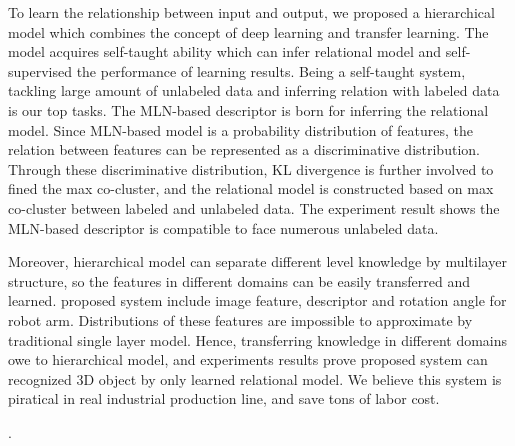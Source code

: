 \documentclass[journal]{IEEEtran}
\begin{document}
To learn the relationship between input and output, we proposed a hierarchical model which combines the concept of deep learning and transfer learning. The model acquires self-taught ability which can infer relational model and self-supervised the performance of learning results. Being a self-taught system, tackling large amount of unlabeled data and inferring relation with labeled data is our top tasks. The MLN-based descriptor is born for inferring the relational model. Since MLN-based model is a probability distribution of features, the relation between features can be represented as a discriminative distribution. Through these discriminative distribution, KL divergence is further involved to fined the max co-cluster, and the relational model is constructed based on max co-cluster between labeled and unlabeled data. The experiment result shows the MLN-based descriptor is compatible to face numerous unlabeled data.

Moreover, hierarchical model can separate different level knowledge by multilayer structure, so the features in different domains can be easily transferred and learned. proposed system include image feature, descriptor and rotation angle for robot arm. Distributions of these features are impossible to approximate by traditional single layer model. Hence, transferring knowledge in different domains owe to hierarchical model, and experiments results prove proposed system can recognized 3D object by only learned relational model. We believe this system is piratical in real industrial production line, and save tons of labor cost.





.
\ifCLASSOPTIONcaptionsoff
  \newpage
\fi
\end{document}
